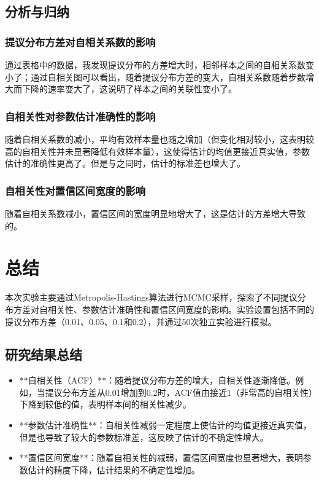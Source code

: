 \documentclass[12pt]{article}
\begin{document}
\subsection{分析与归纳}
\subsubsection{提议分布方差对自相关系数的影响}
通过表格中的数据，我发现提议分布的方差增大时，相邻样本之间的自相关系数变小了；通过自相关图可以看出，随着提议分布方差的变大，自相关系数随着步数增大而下降的速率变大了，这说明了样本之间的关联性变小了。

\subsubsection{自相关性对参数估计准确性的影响}
随着自相关系数的减小，平均有效样本量也随之增加（但变化相对较小，这表明较高的自相关性并未显著降低有效样本量），这使得估计的均值更接近真实值，参数估计的准确性更高了。但是与之同时，估计的标准差也增大了。

\subsubsection{自相关性对置信区间宽度的影响}
随着自相关系数减小，置信区间的宽度明显地增大了，这是估计的方差增大导致的。

\section{总结}
本次实验主要通过Metropolis-Hastings算法进行MCMC采样，探索了不同提议分布方差对自相关性、参数估计准确性和置信区间宽度的影响。实验设置包括不同的提议分布方差（0.01、0.05、0.1和0.2），并通过50次独立实验进行模拟。

\subsection{研究结果总结}

\begin{itemize}
	\item **自相关性（ACF）**：随着提议分布方差的增大，自相关性逐渐降低。例如，当提议分布方差从0.01增加到0.2时，ACF值由接近1（非常高的自相关性）下降到较低的值，表明样本间的相关性减少。
	\item **参数估计准确性**：自相关性减弱一定程度上使估计的均值更接近真实值，但是也导致了较大的参数标准差，这反映了估计的不确定性增大。
	\item **置信区间宽度**：随着自相关性的减弱，置信区间宽度也显著增大，表明参数估计的精度下降，估计结果的不确定性增加。

\end{itemize}
\end{document}
